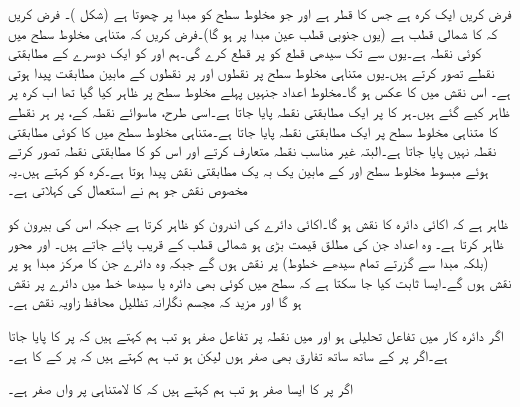 فرض کریں  ایک کرہ ہے جس کا قطر  ہے اور جو مخلوط سطح کو مبدا پر چھوتا ہے (شکل )۔ فرض کریں کہ  کا شمالی قطب   ہے (یوں جنوبی قطب عین مبدا پر ہو گا)۔فرض کریں کہ متناہی مخلوط سطح میں  کوئی نقطہ ہے۔یوں  سے  تک سیدھی قطع  کو  پر قطع کرے گی۔ہم  اور  کو ایک دوسرے کے مطابقتی نقطے تصور کرتے ہیں۔یوں متناہی مخلوط سطح پر نقطوں اور  پر نقطوں کے مابین مطابقت پیدا ہوتی ہے۔ اس نقش میں  کا عکس  ہو گا۔مخلوط اعداد جنہیں پہلے مخلوط سطح پر ظاہر کیا گیا تھا اب کرہ پر ظاہر کیے گئے ہیں۔ہر  کا  پر ایک مطابقتی نقطہ پایا جاتا ہے۔اسی طرح، ماسوائے نقطہ  کے،  پر ہر نقطے کا متناہی مخلوط سطح پر ایک مطابقتی نقطہ پایا جاتا ہے۔متناہی مخلوط سطح میں  کا کوئی مطابقتی نقطہ نہیں پایا جاتا ہے۔البتہ غیر مناسب نقطہ  متعارف کرتے اور اس کو  کا مطابقتی نقطہ تصور کرتے ہوئے مبسوط مخلوط سطح اور  کے مابین یک بہ یک مطابقتی نقش پیدا ہوتا ہے۔کرہ  کو  کہتے ہیں۔یہ مخصوص نقش جو ہم نے استعمال کی  کہلاتی ہے۔

ظاہر  ہے کہ اکائی دائرہ  کا نقش  ہو گا۔اکائی دائرے کی اندرون  کو ظاہر کرتا ہے جبکہ اس کی بیرون  کو ظاہر کرتا ہے۔ وہ اعداد جن کی مطلق قیمت بڑی ہو شمالی قطب  کے قریب پائے جاتے ہیں۔ اور محور  (بلکہ مبدا سے گزرتے تمام سیدھے خطوط)  پر نقش ہوں گے جبکہ وہ دائرے جن کا مرکز مبدا ہو  پر نقش ہوں گے۔ایسا ثابت کیا جا سکتا ہے کہ  سطح میں کوئی بھی دائرہ یا سیدھا خط   میں دائرے پر نقش ہو گا اور مزید کہ مجسم نگارانہ تظلیل  محافظ زاویہ نقش ہے۔

اگر دائرہ کار  میں تفاعل  تحلیلی ہو اور  میں نقطہ  پر تفاعل صفر ہو تب ہم کہتے ہیں کہ  پر  کا  پایا جاتا ہے۔اگر  پر   کے ساتھ ساتھ تفارق  بھی صفر ہوں لیکن   ہو تب ہم کہتے ہیں کہ   پر  کے  کا     ہے۔

اگر  پر  کا ایسا صفر ہو تب ہم کہتے ہیں کہ  کا لامتناہی پر  واں صفر ہے۔

